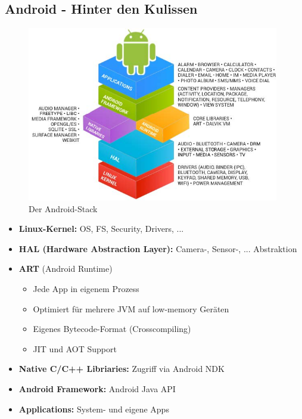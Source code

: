 \documentclass[a4paper]{article}
\begin{document}
	\subsection{Android - Hinter den Kulissen}
	\begin{figure}[h!]
		\centering
		\includegraphics[width=11cm]{img/androidstack.jpg}
		\caption{Der Android-Stack}
		\label{fig:androstack}
	\end{figure}
	\begin{itemize}
		\item \textbf{Linux-Kernel:} OS, FS, Security, Drivers, ...
		\item \textbf{HAL (Hardware Abstraction Layer):} Camera-, Sensor-, ... Abstraktion
		\item \textbf{ART} (Android Runtime)
		\begin{itemize}
			\item Jede App in eigenem Prozess
			\item Optimiert für mehrere JVM auf low-memory Geräten
			\item Eigenes Bytecode-Format (Crosscompiling)
			\item JIT und AOT Support
		\end{itemize}
		\item \textbf{Native C/C++ Libriaries:} Zugriff via Android NDK
		\item \textbf{Android Framework:} Android Java API
		\item \textbf{Applications:} System- und eigene Apps
	\end{itemize}
	\newpage
\end{document}
